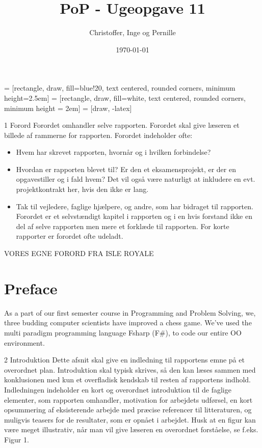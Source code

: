 \documentclass[a4paper]{report}
\title{PoP - Ugeopgave 11}
\author{Christoffer, Inge og Pernille}
\date{\today}
\begin{document}
\maketitle
{} = [rectangle, draw, fill=blue!20, text centered,
    rounded corners, minimum height=2.5em]
 = [rectangle, draw, fill=white, text centered,
    rounded corners, minimum height = 2em]
 = [draw, -latex]



1 Forord
Forordet omhandler selve rapporten. Forordet skal give læseren et billede af rammerne for rapporten.
Forordet indeholder ofte:

\begin{itemize}
\item Hvem har skrevet rapporten, hvornår og i hvilken forbindelse?
\item Hvordan er rapporten blevet til? Er den et eksamensprojekt, er der en opgavestiller og i fald hvem?
Det vil også være naturligt at inkludere en evt. projektkontrakt her, hvis den ikke er lang.
\item Tak til vejledere, faglige hjælpere, og andre, som har bidraget til rapporten.
Forordet er et selvstændigt kapitel i rapporten og i en hvis forstand ikke en del af selve rapporten men
mere et forklæde til rapporten. For korte rapporter er forordet ofte udeladt.
\end{itemize}

VORES EGNE FORORD FRA ISLE ROYALE
\section*{Preface}
As a part of our first semester course in Programming and Problem Solving, we, three budding computer scientists have improved a chess game. We've used the multi paradigm programming language Fsharp (F\#), to code our entire OO environment.

2 Introduktion
Dette afsnit skal give en indledning til rapportens emne på et overordnet plan. Introduktion skal typisk
skrives, så den kan læses sammen med konklusionen med kun et overfladisk kendskab til resten af rapportens indhold. Indledningen indeholder en kort og overordnet introduktion til de faglige elementer, som
rapporten omhandler, motivation for arbejdets udførsel, en kort opsummering af eksisterende arbejde med præcise referencer til litteraturen, og muligvis teasers for de resultater, som er opnået i arbejdet.
Husk at en figur kan være meget illustrativ, når man vil give læseren en overordnet forståelse, se f.eks.
Figur 1.
\end{document}

